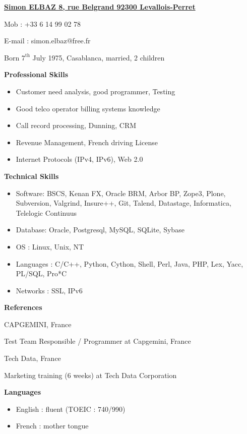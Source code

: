 \documentclass[a4paper,11pt]{letter}
\date{31 July 2008}
\begin{document}
\underline{\textbf{Simon ELBAZ 8, rue Belgrand 92300 Levallois-Perret}}


Mob :    +33 6 14 99 02 78

E-mail : simon.elbaz@free.fr

Born $7^\mathrm{th}$ July 1975, Casablanca, married, 2 children

\begin{framed}
\end{framed}


\textbf{Professional Skills}
\begin{itemize}
\item    Customer need analysis, good programmer, Testing
\item    Good telco operator billing systems knowledge 
\item    Call record processing, Dunning, CRM
\item    Revenue Management, French driving License
\item    Internet Protocols (IPv4, IPv6), Web 2.0
\end{itemize}

\textbf{Technical Skills}
\begin{itemize}
\item    Software: BSCS, Kenan FX, Oracle BRM, Arbor BP, Zope3, Plone, Subversion, Valgrind, Insure++, Git, Talend, Datastage, Informatica, Telelogic Continuus
\item    Database: Oracle, Postgresql, MySQL, SQLite, Sybase
\item    OS : Linux, Unix, NT
\item    Languages : C/C++, Python, Cython, Shell, Perl, Java, PHP, Lex, Yacc, PL/SQL, Pro*C
\item    Networks : SSL, IPv6
\end{itemize}

\textbf{References}

CAPGEMINI, France
	

Test Team Responsible / Programmer at Capgemini, France
	

Tech Data, France
	

Marketing training (6 weeks) at Tech Data Corporation

\textbf{Languages}
\begin{itemize}
\item    English : fluent (TOEIC : 740/990)
\item    French : mother tongue
\end{itemize}
\end{document}
